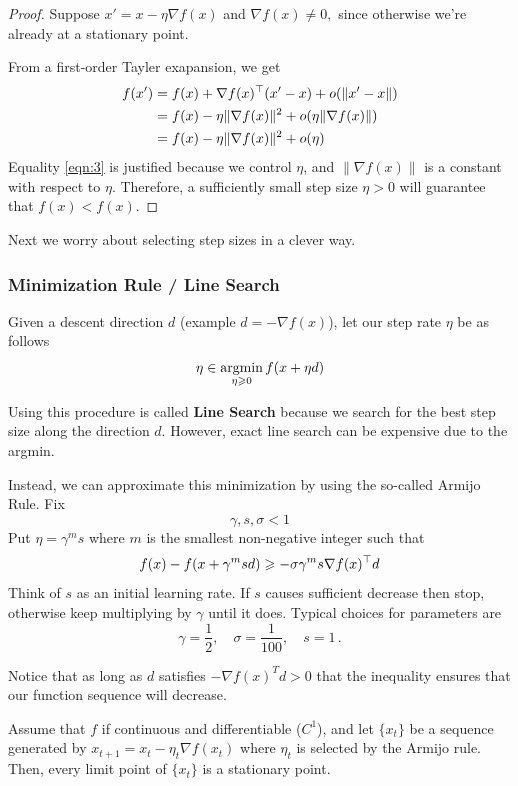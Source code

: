 \begin{proof}
Suppose $x' = x - \eta \nabla f(x)$ and $\nabla f(x)\ne 0,$ since otherwise
we're already at a stationary point.

From a first-order Tayler exapansion, we get
\begin{align}
    f(x') &= f(x) + \nabla f(x)^\top (x' - x) + o(\|x' - x\|) \nonumber\\
    &= f(x) - \eta\|\nabla f(x)\|^2 + o(\eta \|\nabla f(x)\|) \nonumber\\
    &= f(x) - \eta \|\nabla f(x)\|^2 + o(\eta) \label{eqn:3}
\end{align}
Equality \ref{eqn:3} is justified because we control $\eta$, and $\|\nabla
f(x)\|$ is a constant with respect to $\eta$. Therefore, a sufficiently small
step size $\eta>0$ will guarantee that $f(x)<f(x).$
\end{proof}

Next we worry about selecting step sizes in a clever way.

\subsubsection{Minimization Rule / Line Search}

Given a descent direction $d$ (example $d = - \nabla f(x)$), let our step rate $\eta$ be as follows
\[
    \eta \in \mathop{\rm argmin}_{\eta \geqslant 0} f(x + \eta d)
\]

Using this procedure is called \textbf{Line Search} because we search for the best step size along the direction $d$. However, exact line search can be expensive due to the argmin.

Instead, we can approximate this minimization by using the so-called Armijo Rule. 
Fix 
\[
    \gamma, s, \sigma < 1
\]
Put $\eta = \gamma^m s$ where $m$ is the smallest non-negative integer such that
\[
    f(x) - f(x + \gamma^m s d) \geqslant - \sigma \gamma^m s \nabla f(x)^\top d
\]
Think of $s$ as an initial learning rate. If $s$ causes sufficient decrease then
stop, otherwise keep multiplying by $\gamma$ until it does. 
Typical choices for parameters are 
\[
    \gamma = \frac{1}{2},\quad \sigma = \frac{1}{100},\quad s = 1\,.
\]

Notice that as long as $d$ satisfies $-\nabla f(x)^Td > 0$ that the inequality ensures that our function sequence will decrease.

\begin{proposition}
Assume that $f$ if continuous and differentiable ($C^1$), and let $\{x_t\}$ be a sequence generated by $x_{t+1} = x_t - \eta_t \nabla f(x_t)$ where $\eta_t$ is selected by the Armijo rule. Then, every limit point of $\{x_t\}$ is a stationary point.
\end{proposition}

